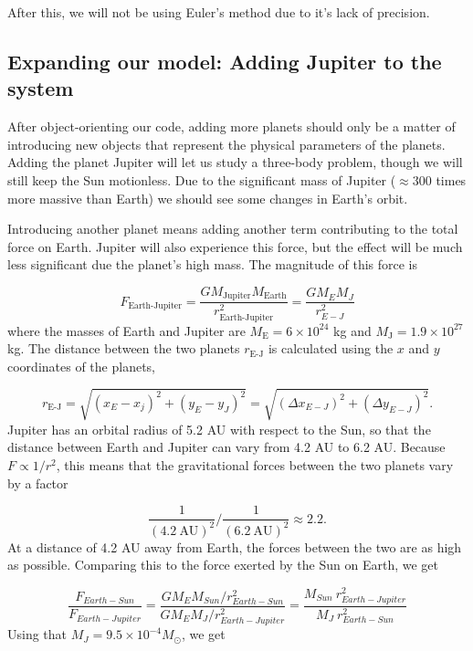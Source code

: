 \documentclass{emulateapj}
\begin{document}
After this, we will not be using Euler's method due to it's lack of precision.

\subsection{Expanding our model: Adding Jupiter to the system}

After object-orienting our code, adding more planets should only be a matter of introducing new objects that represent the physical parameters of the planets. Adding the planet Jupiter will let us study a three-body problem, though we will still keep the Sun motionless. Due to the significant mass of Jupiter ($\approx 300$ times more massive than Earth) we should see some changes in Earth's orbit.

Introducing another planet means adding another term contributing to the total force on Earth. Jupiter will also experience this force, but the effect will be much less significant due the planet's high mass. The magnitude of this force is

\begin{equation}
    F_{\textrm{Earth-Jupiter}} = \frac{GM_{\textrm{Jupiter}} M_{\textrm{Earth}}}{r_{\textrm{Earth-Jupiter}}^2} = \frac{GM_E M_J}{r_{E-J}^2}
\end{equation}
where the masses of Earth and Jupiter are $M_{\textrm{E}} = 6 \times 10^{24}$ kg and $M_{\textrm{J}} = 1.9 \times 10^{27}$ kg. The distance between the two planets $r_{\textrm{E-J}}$ is calculated using the $x$ and $y$ coordinates of the planets,

\begin{equation}
    r_{\textrm{E-J}} = \sqrt{\left(x_E - x_j\right)^2 + \left(y_E - y_J\right)^2 } = \sqrt{(\Delta x_{E-J})^2 + (\Delta y_{E-J})^2}.
\end{equation}
Jupiter has an orbital radius of 5.2 AU with respect to the Sun, so that the distance between Earth and Jupiter can vary from 4.2 AU to 6.2 AU. Because $F \propto 1/r^2$, this means that the gravitational forces between the two planets vary by a factor

\begin{equation}
    \frac{1}{(4.2 \ \textrm{AU})^2} \bigg/  \frac{1}{(6.2 \ \textrm{AU})^2} \approx 2.2.
\end{equation}
At a distance of 4.2 AU away from Earth, the forces between the two are as high as possible. Comparing this to the force exerted by the Sun on Earth, we get

\begin{equation}
    \frac{F_{Earth-Sun}}{F_{Earth-Jupiter}} = \frac{G M_E M_{Sun}/r_{Earth-Sun}^2}{G M_E M_J/r_{Earth-Jupiter}^2} = \frac{M_{Sun} \ r_{Earth-Jupiter}^2}{M_J \ r_{Earth-Sun}^2}
\end{equation}
Using that $M_{J} = 9.5 \times 10^{-4} M_\odot$, we get
\end{document}
